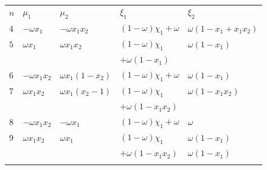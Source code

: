 \documentclass[oneside,onecolumn,10pt,final]{asme2ej}
\begin{document}
\begin{table}[tb]
  \centering
  \caption{
    \cite{rf:taylordj1,rf:jdelia-gbem1}}
  \smallskip
  \label{ta:duffy_arista_comun2}
  \begin{tabular}{lllll}
    \hline\noalign{\smallskip}
   $n$ & %
   $ \mu_1$        &
   $ \mu_2 $       &
   $ \xi_1$        &
   $ \xi_2$        \\
  \noalign{\smallskip}\hline\noalign{\smallskip}
 $ 4 $                    &
 $ -\omega x_1 $                  &
 $ -\omega x_1 x_2$               &
 $ (1 - \omega) \chi_1 + \omega $ &
 $ \omega (1 - x_1 + x_1 x_2) $   \\
 $ 5 $                    &
 $ \omega x_1 $                   &
 $ \omega x_1 x_2$                &
 $ (1-\omega) \chi_1 $            &    %
 $ \omega (1 - x_1)               $ \\
                                  &
                                  &
                                  &
 $ + \omega (1 - x_1) $           &
                                    \\
 $ 6 $                    &
 $ -\omega x_1 x_2$               &
 $  \omega x_1 (1 - x_2) $        &
 $ (1 - \omega) \chi_1 + \omega $ &
 $ \omega (1 - x_1)             $ \\
 $ 7 $                    &
 $ \omega x_1 x_2       $         &
 $ \omega x_1 (x_2 - 1) $         &
 $ (1 - \omega) \chi_1  $         &  %
 $ \omega (1 - x_1 x_2)         $ \\
                                  &
                                  &
                                  &
 $ + \omega (1 - x_1 x_2) $       &
                                  \\
 $ 8 $                    &
 $ -\omega x_1 x_2 $              &
 $ -\omega x_1 $                  &
 $ (1 - \omega) \chi_1 + \omega $ &
 $ \omega                       $ \\
 $ 9 $                    &
 $  \omega x_1 x_2 $              &
 $  \omega x_1 $                  &
 $ (1 - \omega) \chi_1 $          & %
 $ \omega (1 - x_1)               $ \\
                                  &
                                  &
                                  &
 $ + \omega (1 - x_1 x_2) $       &
 $ \omega (1 - x_1) $             \\
  \noalign{\smallskip}\hline
\end{tabular}
\end{table}
\end{document}
